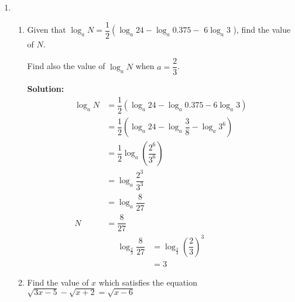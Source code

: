 \documentclass{report}
\newcommand{\sol}{\vspace{0.2cm}\textbf{Solution:}\vspace{0.2cm}}
\begin{document}
\begin{multicols*}{2}
\begin{enumerate}[leftmargin=*]
        \item \begin{enumerate}
                  \item Given that $\log _a N=\dfrac{1}{2}\left(\log _a 24-\log _a 0.375-\right.$ $6
                            \log _a 3$ ), find the value of $N$.

                            Find also the value of $\log _a N$ when $a=\dfrac{2}{3}$.

                        \sol{}
                        \begin{align*}
                            \log_a N & = \dfrac{1}{2}(\log_a 24 - \log_a 0.375 - 6 \log_a 3)        \\
                                     & = \dfrac{1}{2}(\log_a 24 - \log_a \dfrac{3}{8} - \log_a 3^6) \\
                                     & = \dfrac{1}{2}\log_a \left(\dfrac{2^6}{3^6}\right)           \\
                                     & = \log_a \dfrac{2^3}{3^3}                                    \\
                                     & = \log_a \dfrac{8}{27}                                       \\
                            N        & = \dfrac{8}{27}
                        \end{align*}
                        \begin{align*}
                            \log_\frac{2}{3} \dfrac{8}{27} & = \log_\frac{2}{3} \left(\dfrac{2}{3}\right)^{3} \\
                                                           & = 3
                        \end{align*}

                  \item Find the value of $x$ which satisfies the equation $\sqrt{3
                                x-5}-\sqrt{x+2}=\sqrt{x-6}$


\end{enumerate}
\end{enumerate}
\end{multicols*}
\end{document}
